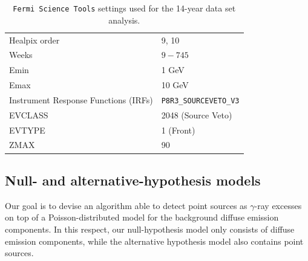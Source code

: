 \begin{table}[t]
\centering
\begin{tabular}{ | l| l|  }
\hline
Healpix order & 9, 10  \\ 
Weeks & $9-745$  \\ 
Emin & 1 GeV \\
Emax & 10 GeV \\
Instrument Response Functions (IRFs) & \verb|P8R3_SOURCEVETO_V3| \\
EVCLASS & 2048 (Source Veto)  \\ 
EVTYPE & 1 (Front)  \\
ZMAX & 90 \\
\hline
\end{tabular}
\caption{\texttt{Fermi Science Tools} settings used for the 14-year data set analysis. }
\label{tab:catalog:settings}
\end{table}

\subsection{Null- and alternative-hypothesis models}

Our goal is to devise an algorithm able to detect point sources as $\gamma$-ray excesses
on top of a Poisson-distributed model for the background diffuse emission components. 
In this respect, our null-hypothesis model only consists of diffuse emission components, while
the alternative hypothesis model also contains point sources. 

